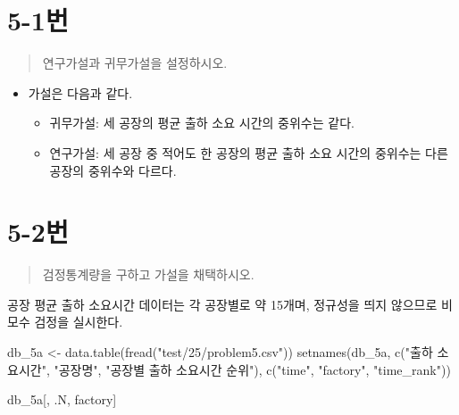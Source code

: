 \documentclass[
  letterpaper,
  DIV=11,
  numbers=noendperiod]{scrreprt}
\newenvironment{Shaded}{\begin{snugshade}}{\end{snugshade}}
\newcommand{\FunctionTok}[1]{\textcolor[rgb]{0.28,0.35,0.67}{#1}}
\newcommand{\NormalTok}[1]{\textcolor[rgb]{0.00,0.23,0.31}{#1}}
\newcommand{\OtherTok}[1]{\textcolor[rgb]{0.00,0.23,0.31}{#1}}
\newcommand{\StringTok}[1]{\textcolor[rgb]{0.13,0.47,0.30}{#1}}
\providecommand{\tightlist}{%
  \setlength{\itemsep}{0pt}\setlength{\parskip}{0pt}}\usepackage{longtable,booktabs,array}
\begin{document}
\hypertarget{uxbc88-57}{%
\section*{5-1번}\label{uxbc88-57}}


\begin{quote}
연구가설과 귀무가설을 설정하시오.
\end{quote}

\begin{itemize}
\tightlist
\item
  가설은 다음과 같다.

  \begin{itemize}
  \tightlist
  \item
    귀무가설: 세 공장의 평균 출하 소요 시간의 중위수는 같다.
  \item
    연구가설: 세 공장 중 적어도 한 공장의 평균 출하 소요 시간의 중위수는
    다른 공장의 중위수와 다르다.
  \end{itemize}
\end{itemize}

\hypertarget{uxbc88-58}{%
\section*{5-2번}\label{uxbc88-58}}


\begin{quote}
검정통계량을 구하고 가설을 채택하시오.
\end{quote}

공장 평균 출하 소요시간 데이터는 각 공장별로 약 15개며, 정규성을 띄지
않으므로 비모수 검정을 실시한다.

\begin{Shaded}
\begin{Highlighting}[]
\NormalTok{db\_5a }\OtherTok{\textless{}{-}} \FunctionTok{data.table}\NormalTok{(}\FunctionTok{fread}\NormalTok{(}\StringTok{"test/25/problem5.csv"}\NormalTok{))}
\FunctionTok{setnames}\NormalTok{(db\_5a, }\FunctionTok{c}\NormalTok{(}\StringTok{"출하 소요시간"}\NormalTok{, }\StringTok{"공장명"}\NormalTok{, }\StringTok{"공장별 출하 소요시간 순위"}\NormalTok{), }
         \FunctionTok{c}\NormalTok{(}\StringTok{"time"}\NormalTok{, }\StringTok{"factory"}\NormalTok{, }\StringTok{"time\_rank"}\NormalTok{))}

\NormalTok{db\_5a[, .N, factory]}
\end{Highlighting}
\end{Shaded}
\end{document}
